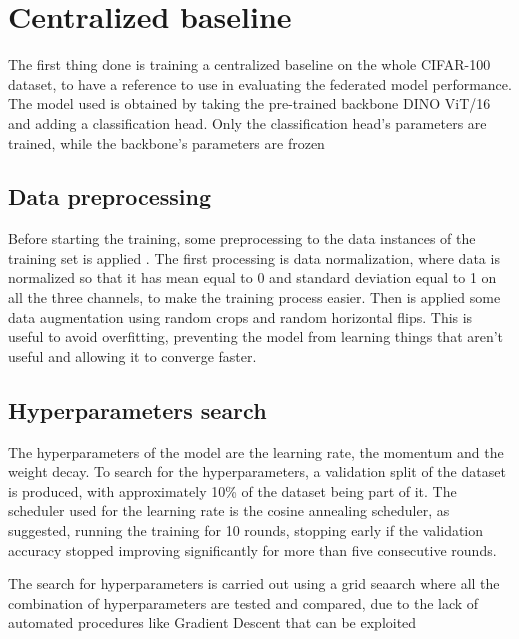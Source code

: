 \documentclass[10pt,twocolumn,letterpaper]{article}
\begin{document}
\section{Centralized baseline}

The first thing done is training a centralized baseline on the whole CIFAR-100 dataset, to have a reference to use in evaluating the federated model performance. The model used  is obtained by taking the pre-trained backbone DINO ViT/16 and adding a classification head. Only the classification head's parameters are trained, while the backbone's parameters are frozen


\subsection{Data preprocessing}

Before starting the training, some preprocessing to the data instances of the training set is applied . The first processing is data normalization, where data is normalized so that it has mean equal to 0 and standard deviation equal to 1 on all the three channels, to make the training process easier. Then is applied some data augmentation using random crops and random horizontal flips. This is useful to avoid overfitting, preventing the model from learning things that aren't useful and allowing it to converge faster.


\subsection{Hyperparameters search}

The hyperparameters of the model are the learning rate, the momentum and the weight decay. To search for the hyperparameters, a validation split of the dataset is produced, with approximately 10\% of the dataset being part of it.
The scheduler used for the learning rate is the cosine annealing scheduler, as suggested, running the training for 10 rounds, stopping early if the validation accuracy stopped improving significantly for more than five consecutive rounds.

The search for hyperparameters is carried out using a grid seaarch where all the combination of hyperparameters are tested and compared, due to the lack of automated procedures like Gradient Descent that can be exploited
\end{document}
